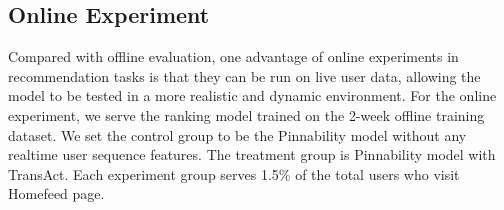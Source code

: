 


\subsection{Online Experiment}
Compared with offline evaluation, one advantage of online experiments in recommendation tasks is that they can be run on live user data, allowing the model to be tested in a more realistic and dynamic environment. 
For the online experiment, we serve the ranking model trained on the 2-week offline training dataset. We set the control group to be the Pinnability model without any realtime user sequence features. The treatment group is Pinnability model with TransAct. Each experiment group serves 1.5\% of the total users who visit Homefeed page.



